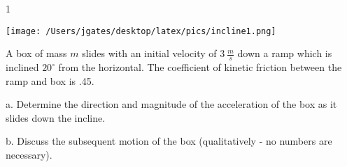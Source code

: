 
\AddToShipoutPicture*{\BackgroundPic}

\addtocounter {ProbNum} {1}

\begin{floatingfigure}[r]{.25\textwidth}
\texttt{[image: /Users/jgates/desktop/latex/pics/incline1.png]}
\end{floatingfigure} 

{\bf \Large{}} A box of mass ${m}$ slides with an initial velocity of ${3~\tfrac{m}{s}}$ down a ramp which is inclined ${20^\circ}$ from the horizontal.  The coefficient of kinetic friction between the ramp and box is .45.

\bigskip

\indent  a. Determine the direction and magnitude of the acceleration of the box as it slides down the incline. 

\vfill

b. Discuss the subsequent motion of the box (qualitatively - no numbers are necessary).

\vspace{25mm}

\newpage
